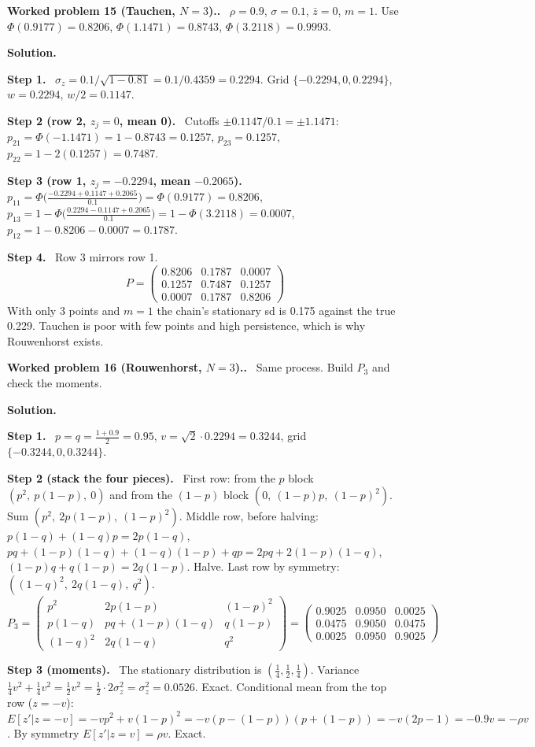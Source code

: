 \documentclass[12pt]{article}
\newcommand{\st}[1]{\par\smallskip\textbf{Step #1.}\ }
\newcommand{\ans}[1]{\[\boxed{\ #1\ }\]}
\newcommand{\prob}[1]{\par\bigskip\textbf{Worked problem #1.}\ }
\newcommand{\sol}{\par\smallskip\textbf{Solution.}\par}
\begin{document}
\prob{15 (Tauchen, $N=3$).} $\rho=0.9$, $\sigma=0.1$, $\bar z=0$, $m=1$. Use
$\Phi(0.9177)=0.8206$, $\Phi(1.1471)=0.8743$, $\Phi(3.2118)=0.9993$.
\sol
\st{1} $\sigma_z=0.1/\sqrt{1-0.81}=0.1/0.4359=0.2294$. Grid $\{-0.2294,0,0.2294\}$, $w=0.2294$, $w/2=0.1147$.
\st{2 (row 2, $z_j=0$, mean 0)} Cutoffs $\pm0.1147/0.1=\pm1.1471$:
$p_{21}=\Phi(-1.1471)=1-0.8743=0.1257$, $p_{23}=0.1257$, $p_{22}=1-2(0.1257)=0.7487$.
\st{3 (row 1, $z_j=-0.2294$, mean $-0.2065$)}
$p_{11}=\Phi\big(\frac{-0.2294+0.1147+0.2065}{0.1}\big)=\Phi(0.9177)=0.8206$,
$p_{13}=1-\Phi\big(\frac{0.2294-0.1147+0.2065}{0.1}\big)=1-\Phi(3.2118)=0.0007$,
$p_{12}=1-0.8206-0.0007=0.1787$.
\st{4} Row 3 mirrors row 1.
\ans{P=\begin{pmatrix}0.8206&0.1787&0.0007\\0.1257&0.7487&0.1257\\0.0007&0.1787&0.8206\end{pmatrix}}
With only 3 points and $m=1$ the chain's stationary sd is 0.175 against the true 0.229. Tauchen is poor with few points and high persistence, which is why Rouwenhorst exists.

\prob{16 (Rouwenhorst, $N=3$).} Same process. Build $P_3$ and check the moments.
\sol
\st{1} $p=q=\frac{1+0.9}{2}=0.95$, $v=\sqrt2\cdot0.2294=0.3244$, grid $\{-0.3244,0,0.3244\}$.
\st{2 (stack the four pieces)} First row: from the $p$ block $(p^2,\ p(1-p),\ 0)$ and from the $(1-p)$ block $(0,\ (1-p)p,\ (1-p)^2)$. Sum $(p^2,\ 2p(1-p),\ (1-p)^2)$.
Middle row, before halving: $p(1-q)+(1-q)p=2p(1-q)$, $pq+(1-p)(1-q)+(1-q)(1-p)+qp=2pq+2(1-p)(1-q)$, $(1-p)q+q(1-p)=2q(1-p)$. Halve.
Last row by symmetry: $((1-q)^2,\ 2q(1-q),\ q^2)$.
\[
P_3=\begin{pmatrix}p^2&2p(1-p)&(1-p)^2\\p(1-q)&pq+(1-p)(1-q)&q(1-p)\\(1-q)^2&2q(1-q)&q^2\end{pmatrix}
=\begin{pmatrix}0.9025&0.0950&0.0025\\0.0475&0.9050&0.0475\\0.0025&0.0950&0.9025\end{pmatrix}
\]
\st{3 (moments)} The stationary distribution is $(\tfrac14,\tfrac12,\tfrac14)$. Variance $\tfrac14v^2+\tfrac14v^2=\tfrac12v^2=\tfrac12\cdot2\sigma_z^2=\sigma_z^2=0.0526$. Exact.
Conditional mean from the top row ($z=-v$): $E[z'|z=-v]=-vp^2+v(1-p)^2=-v(p-(1-p))(p+(1-p))=-v(2p-1)=-0.9v=-\rho v$. By symmetry $E[z'|z=v]=\rho v$. Exact.

\end{document}
